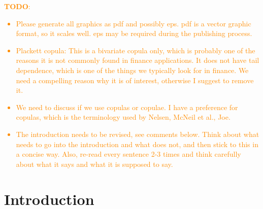 \documentclass[11pt,a4paper,english]{article}
\providecommand{\natp}[1]{\textcolor{darkorange}{#1}}
\begin{document}
\natp{{\bf TODO}:
  \begin{itemize}
  \item Please generate all graphics as pdf and possibly eps. pdf is a
    vector graphic format, so it scales well. eps may be
    required during the publishing process.
  \item Plackett copula: This is a bivariate copula only, which is
    probably one of the reasons it is not commonly found in finance
    applications. It does not have tail dependence, which is one of
    the things we typically look for in finance. We need a compelling
    reason why it is of interest, otherwise I suggest to remove it.
  \item We need to discuss if we use copulas or copulae. I have a
    preference for copulas, which is the terminology used by Nelsen,
    McNeil et al., Joe.
  \item The introduction needs to be revised, see comments
    below. Think about what needs to go into the introduction and what
    does not, and then stick to this in a concise way. Also, re-read
    every sentence 2-3 times and think carefully about what it says
    and what it is supposed to say. 
  \end{itemize}
}


\clearpage
\section{Introduction}\label{sec:introduction}
\end{document}
